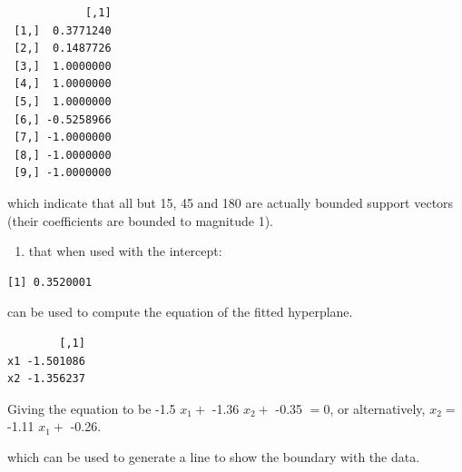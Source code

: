 \documentclass[
  letterpaper,
]{book}
\newenvironment{Shaded}{\begin{snugshade}}{\end{snugshade}}
\newcommand{\AttributeTok}[1]{\textcolor[rgb]{0.40,0.45,0.13}{#1}}
\newcommand{\DecValTok}[1]{\textcolor[rgb]{0.68,0.00,0.00}{#1}}
\newcommand{\FunctionTok}[1]{\textcolor[rgb]{0.28,0.35,0.67}{#1}}
\newcommand{\NormalTok}[1]{\textcolor[rgb]{0.00,0.23,0.31}{#1}}
\newcommand{\OtherTok}[1]{\textcolor[rgb]{0.00,0.23,0.31}{#1}}
\newcommand{\SpecialCharTok}[1]{\textcolor[rgb]{0.37,0.37,0.37}{#1}}
\providecommand{\tightlist}{%
  \setlength{\itemsep}{0pt}\setlength{\parskip}{0pt}}\usepackage{longtable,booktabs,array}
\begin{document}
\begin{verbatim}
            [,1]
 [1,]  0.3771240
 [2,]  0.1487726
 [3,]  1.0000000
 [4,]  1.0000000
 [5,]  1.0000000
 [6,] -0.5258966
 [7,] -1.0000000
 [8,] -1.0000000
 [9,] -1.0000000
\end{verbatim}

which indicate that all but 15, 45 and 180 are actually bounded support
vectors (their coefficients are bounded to magnitude 1).

\begin{enumerate}
\def\labelenumi{\arabic{enumi}.}
\setcounter{enumi}{2}
\tightlist
\item
  that when used with the intercept:
\end{enumerate}

\begin{Shaded}
\end{Shaded}

\begin{verbatim}
[1] 0.3520001
\end{verbatim}

can be used to compute the equation of the fitted hyperplane.

\begin{Shaded}
\end{Shaded}

\begin{verbatim}
        [,1]
x1 -1.501086
x2 -1.356237
\end{verbatim}

Giving the equation to be -1.5 \(x_1 +\) -1.36 \(x_2 +\) -0.35 \(=0\),
or alternatively, \(x_2 =\) -1.11 \(x_1 +\) -0.26.

which can be used to generate a line to show the boundary with the data.

\begin{Shaded}
\end{Shaded}
\end{document}
